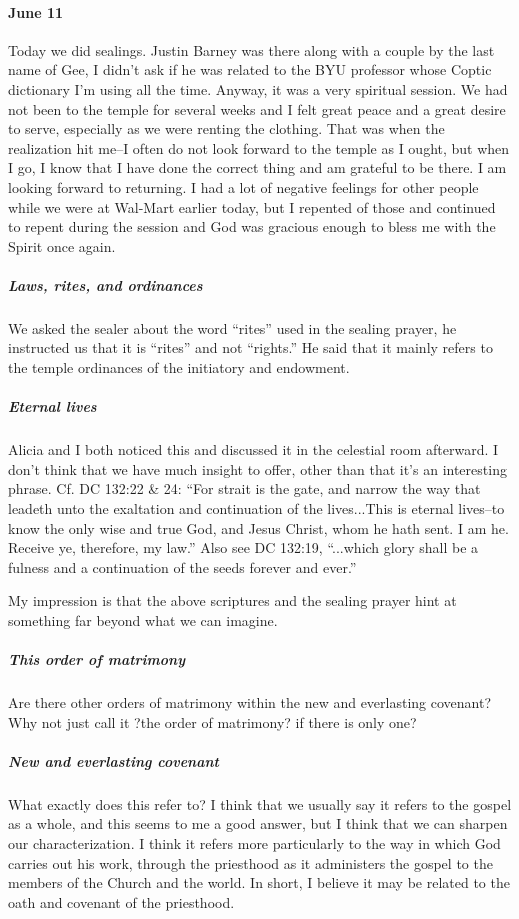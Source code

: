 			\paragraph*{June 11} Today we did sealings. Justin Barney was there along with a couple by the last name of Gee, I didn't ask if he was related to the BYU professor whose Coptic dictionary I'm using all the time. Anyway, it was a very spiritual session. We had not been to the temple for several weeks and I felt great peace and a great desire to serve, especially as we were renting the clothing. That was when the realization hit me--I often do not look forward to the temple as I ought, but when I go, I know that I have done the correct thing and am grateful to be there. I am looking forward to returning. I had a lot of negative feelings for other people while we were at Wal-Mart earlier today, but I repented of those and continued to repent during the session and God was gracious enough to bless me with the Spirit once again.

				\subparagraph*{Laws, rites, and ordinances} We asked the sealer about the word ``rites'' used in the sealing prayer, he instructed us that it is ``rites'' and not ``rights.'' He said that it mainly refers to the temple ordinances of the initiatory and endowment.

				\subparagraph*{Eternal lives} Alicia and I both noticed this and discussed it in the celestial room afterward. I don't think that we have much insight to offer, other than that it's an interesting phrase. Cf. DC 132:22 \& 24: ``For strait is the gate, and narrow the way that leadeth unto the exaltation and continuation of the lives...This is eternal lives--to know the only wise and true God, and Jesus Christ, whom he hath sent. I am he. Receive ye, therefore, my law.'' Also see DC 132:19, ``...which glory shall be a fulness and a continuation of the seeds forever and ever.''

				My impression is that the above scriptures and the sealing prayer hint at something far beyond what we can imagine.

				\subparagraph*{This order of matrimony} Are there other orders of matrimony within the new and everlasting covenant? Why not just call it ?the order of matrimony? if there is only one?

				\subparagraph*{New and everlasting covenant} What exactly does this refer to? I think that we usually say it refers to the gospel as a whole, and this seems to me a good answer, but I think that we can sharpen our characterization. I think it refers more particularly to the way in which God carries out his work, through the priesthood as it administers the gospel to the members of the Church and the world. In short, I believe it may be related to the oath and covenant of the priesthood.

